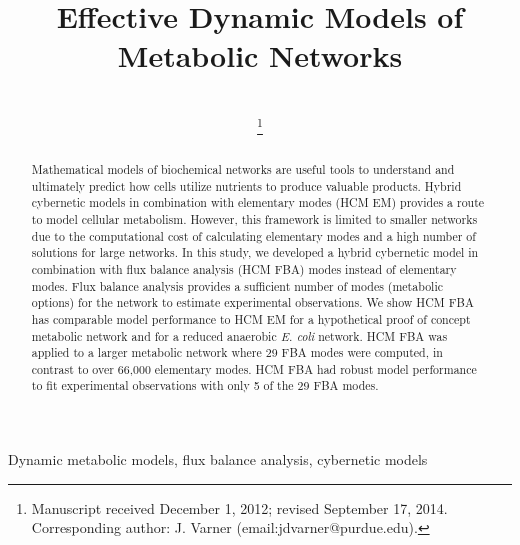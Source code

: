 \documentclass[10pt,twocolumn,twoside,final]{IEEEtran}
\begin{document}
\title{Effective Dynamic Models of Metabolic Networks}


\author{\\
\thanks{Manuscript received December 1, 2012; revised September 17, 2014.
Corresponding author: J. Varner (email:jdvarner@purdue.edu).}}

\maketitle

\begin{abstract}
Mathematical models of biochemical networks are useful tools to understand and ultimately predict how cells utilize nutrients to produce valuable products.
Hybrid cybernetic models in combination with elementary modes (HCM EM) provides a route to model cellular metabolism.
However, this framework is limited to smaller networks due to the computational cost of calculating elementary modes and a high number of solutions for large networks.
In this study, we developed a hybrid cybernetic model in combination with flux balance analysis (HCM FBA) modes instead of elementary modes.
Flux balance analysis provides a sufficient number of modes (metabolic options) for the network to estimate experimental observations.
We show HCM FBA has comparable model performance to HCM EM for a hypothetical proof of concept metabolic network and for a reduced anaerobic \textit{E. coli} network.
HCM FBA was applied to a larger metabolic network where 29 FBA modes were computed, in contrast to over 66,000 elementary modes. HCM FBA had robust model performance to fit experimental observations with only 5 of the 29 FBA modes.

\end{abstract}


\begin{IEEEkeywords}
Dynamic metabolic models, flux balance analysis, cybernetic models
\end{IEEEkeywords}
\end{document}
